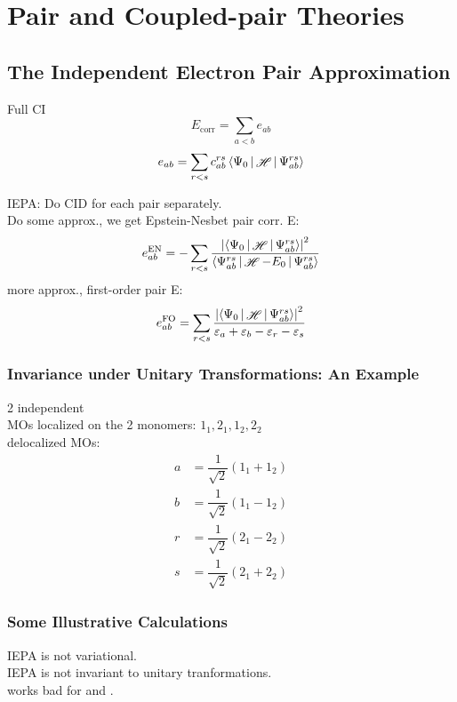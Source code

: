 \documentclass[a4paper]{article}
\DeclareMathOperator{\sH}{\mathscr{H}}
\DeclareMathOperator{\corr}{\mathrm{corr}}
\numberwithin{equation}{section}
\begin{document}
\section{Pair and Coupled-pair Theories}
\subsection{The Independent Electron Pair Approximation}
Full CI
\begin{equation}\label{key}
E_{\corr} = \sum_{a<b} e_{ab}
\end{equation}
\begin{equation}\label{key}
e_{ab} = \sum_{r<s} c_{ab}^{rs} \Braket{\Psi_0 | \sH | \Psi_{ab}^{rs}}
\end{equation}

IEPA: Do CID for each pair separately.\\
Do some approx., we get Epstein-Nesbet pair corr. E:
\begin{equation}\label{key}
e_{ab}^{\text{EN}} = -\sum_{r<s} \dfrac{\abs{\Braket{\Psi_0|\sH|\Psi_{ab}^{rs}}}^2}{\Braket{\Psi_{ab}^{rs} | \sH - E_0 | \Psi_{ab}^{rs}}}
\end{equation}
more approx., first-order pair E:
\begin{equation}\label{key}
e_{ab}^{\text{FO}} = \sum_{r<s} \dfrac{\abs{\Braket{\Psi_0|\sH|\Psi_{ab}^{rs}}}^2}{\varepsilon_a + \varepsilon_b - \varepsilon_r - \varepsilon_s}
\end{equation}



\subsubsection{Invariance under Unitary Transformations: An Example}
2 independent  \\
MOs localized on the 2 monomers: $ 1_1, 2_1, 1_2, 2_2 $\\
delocalized MOs: 
\begin{align}
a &= \dfrac{1}{\sqrt{2}} (1_1 + 1_2) \\
b &= \dfrac{1}{\sqrt{2}} (1_1 - 1_2) \\
r &= \dfrac{1}{\sqrt{2}} (2_1 - 2_2) \\
s &= \dfrac{1}{\sqrt{2}} (2_1 + 2_2) 
\end{align}
\subsubsection{Some Illustrative Calculations}
IEPA is not variational.\\
IEPA is not invariant to unitary tranformations.\\
works bad for  and .
\end{document}
